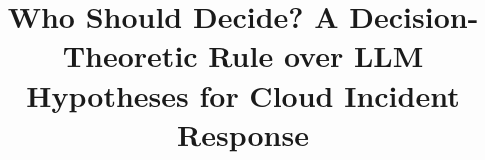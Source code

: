 \documentclass[conference]{IEEEtran}
\begin{document}
\title{Who Should Decide? A Decision-Theoretic Rule over LLM Hypotheses for Cloud Incident Response}
\author{}
\maketitle





\end{document}
